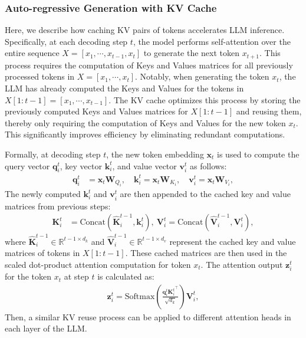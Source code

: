 \subsubsection{Auto-regressive Generation with KV Cache}
Here, we describe how caching KV pairs of tokens accelerates LLM inference. Specifically, at each decoding step \( t \), the model performs self-attention over the entire sequence \( X = [x_1, \cdots, x_{t-1}, x_t] \) to generate the next token \( x_{t+1} \). This process requires the computation of Keys and Values matrices for all previously processed tokens in \( X = [x_1, \cdots, x_t] \).
Notably, when generating the token \( x_t \), the LLM has already computed the Keys and Values for the tokens in \( X[1:t-1] = [x_1, \cdots, x_{t-1}] \). The KV cache optimizes this process by storing the previously computed Keys and Values  matrices for \( X[1:t-1] \) and reusing them, thereby only requiring the computation of Keys and Values for the new token \( x_t \). This significantly improves efficiency by eliminating redundant computations.

Formally, at decoding step $t$, the new token embedding $\mathbf{x}_t$ is used to compute the query vector $\mathbf{q}^t_i$, key vector $\mathbf{k}^t_i$, and value vector $\mathbf{v}^t_i$ as follows:
\begin{align}
\mathbf{q}_i^t &= \mathbf{x}_t \mathbf{W}_{Q_i}, \quad
\mathbf{k}_i^t  = \mathbf{x}_t \mathbf{W}_{K_i}, \quad
\mathbf{v}_i^t  = \mathbf{x}_t \mathbf{W}_{V_i},
\end{align}
The newly computed $\mathbf{k}_i^t $ and $\mathbf{v}_i^t $ are then appended to the cached key and value matrices from previous steps:
\begin{align}
\mathbf{K}_i^{t} &= \text{Concat}(\mathbf{\hat{K}}_i^{t-1}, \mathbf{k}_i^t ), \ 
\mathbf{V}_i^{t} = \text{Concat}(\mathbf{\hat{V}}^{t-1}_i, \mathbf{V}_i^t ),
\end{align}
where $\mathbf{\hat{K}}_i^{t-1} \in \mathbb{R}^{t-1 \times d_k}$ and $\mathbf{\hat{V}}_i^{t-1} \in \mathbb{R}^{t-1 \times d_v}$ represent the cached key and value matrices of tokens in $X[1:t-1]$. 
These cached matrices are then used in the scaled dot-product attention computation for token $x_t$.
The attention output $\mathbf{z}^t_i$ for the token $x_t$ at step $t$ is calculated as:
\begin{align}
\mathbf{z}^t_i = \text{Softmax}\left(\frac{\mathbf{q}_i^t {\mathbf{K}_i^t}^\top}{\sqrt{d_k}}\right) \mathbf{V}_i^t,
\end{align}
\noindent Then, a similar KV reuse process can be applied to different attention heads in each layer of the LLM.



